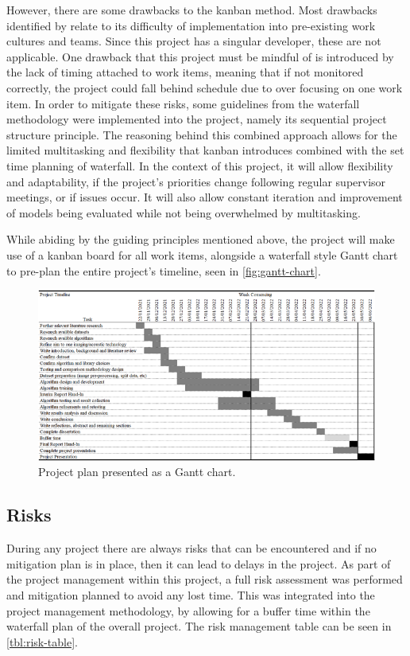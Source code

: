 However, there are some drawbacks to the kanban method. Most drawbacks identified by \cite{ahmad2013kanban} relate to its difficulty of implementation into pre-existing work cultures and teams. Since this project has a singular developer, these are not applicable. One drawback that this project must be mindful of is introduced by the lack of timing attached to work items, meaning that if not monitored correctly, the project could fall behind schedule due to over focusing on one work item. In order to mitigate these risks, some guidelines from the waterfall methodology were implemented into the project, namely its sequential project structure principle. The reasoning behind this combined approach allows for the limited multitasking and flexibility that kanban introduces combined with the set time planning of waterfall. In the context of this project, it will allow flexibility and adaptability, if the project's priorities change following regular supervisor meetings, or if issues occur. It will also allow constant iteration and improvement of models being evaluated while not being overwhelmed by multitasking.

While abiding by the guiding principles mentioned above, the project will make use of a kanban board for all work items, alongside a waterfall style Gantt chart to pre-plan the entire project's timeline, seen in \autoref{fig:gantt-chart}.

\begin{figure}[H]
    \centering
    \includegraphics[width=\textwidth]{figures/gantt-chart.png}
    \caption{Project plan presented as a Gantt chart.}
    \label{fig:gantt-chart}
\end{figure}

\subsection{Risks}
During any project there are always risks that can be encountered and if no mitigation plan is in place, then it can lead to delays in the project. As part of the project management within this project, a full risk assessment was performed and mitigation planned to avoid any lost time. This was integrated into the project management methodology, by allowing for a buffer time within the waterfall plan of the overall project. The risk management table can be seen in \autoref{tbl:risk-table}.

